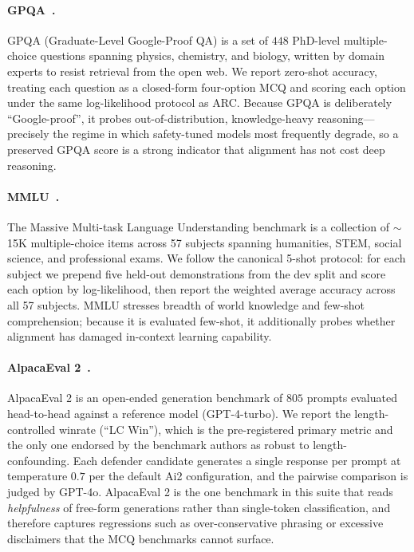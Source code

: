 \documentclass{article}
\begin{document}
\paragraph{GPQA~\citep{rein2023gpqa}.} GPQA (Graduate-Level Google-Proof QA) is a set of $448$ PhD-level multiple-choice questions spanning physics, chemistry, and biology, written by domain experts to resist retrieval from the open web. We report zero-shot accuracy, treating each question as a closed-form four-option MCQ and scoring each option under the same log-likelihood protocol as ARC. Because GPQA is deliberately ``Google-proof'', it probes out-of-distribution, knowledge-heavy reasoning---precisely the regime in which safety-tuned models most frequently degrade, so a preserved GPQA score is a strong indicator that alignment has not cost deep reasoning.

\paragraph{MMLU~\citep{hendrycks2021mmlu}.} The Massive Multi-task Language Understanding benchmark is a collection of $\sim$15K multiple-choice items across 57 subjects spanning humanities, STEM, social science, and professional exams. We follow the canonical 5-shot protocol: for each subject we prepend five held-out demonstrations from the dev split and score each option by log-likelihood, then report the weighted average accuracy across all 57 subjects. MMLU stresses breadth of world knowledge and few-shot comprehension; because it is evaluated few-shot, it additionally probes whether alignment has damaged in-context learning capability.

\paragraph{AlpacaEval 2~\citep{dubois2024alpacaeval2}.} AlpacaEval 2 is an open-ended generation benchmark of $805$ prompts evaluated head-to-head against a reference model (GPT-4-turbo). We report the length-controlled winrate (``LC Win''), which is the pre-registered primary metric and the only one endorsed by the benchmark authors as robust to length-confounding. Each defender candidate generates a single response per prompt at temperature $0.7$ per the default Ai2 configuration, and the pairwise comparison is judged by GPT-4o. AlpacaEval 2 is the one benchmark in this suite that reads \emph{helpfulness} of free-form generations rather than single-token classification, and therefore captures regressions such as over-conservative phrasing or excessive disclaimers that the MCQ benchmarks cannot surface.
\end{document}
